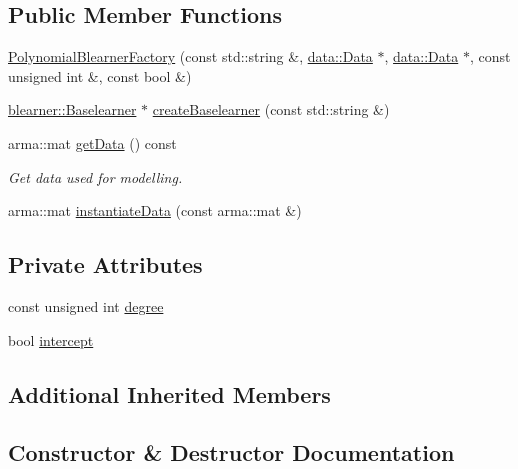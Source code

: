 \subsection*{Public Member Functions}
\begin{DoxyCompactItemize}
\item 
\mbox{\hyperlink{classblearnerfactory_1_1_polynomial_blearner_factory_a4db6750e7534eb7731cc3d60350d91cf}{Polynomial\+Blearner\+Factory}} (const std\+::string \&, \mbox{\hyperlink{classdata_1_1_data}{data\+::\+Data}} $\ast$, \mbox{\hyperlink{classdata_1_1_data}{data\+::\+Data}} $\ast$, const unsigned int \&, const bool \&)
\item 
\mbox{\hyperlink{classblearner_1_1_baselearner}{blearner\+::\+Baselearner}} $\ast$ \mbox{\hyperlink{classblearnerfactory_1_1_polynomial_blearner_factory_ac0c7f742da0a2de444e91a0cfb0a9384}{create\+Baselearner}} (const std\+::string \&)
\item 
arma\+::mat \mbox{\hyperlink{classblearnerfactory_1_1_polynomial_blearner_factory_addce36fbb590b2cd3d9325b53ae74566}{get\+Data}} () const
\begin{DoxyCompactList}\small\item\em Get data used for modelling. \end{DoxyCompactList}\item 
arma\+::mat \mbox{\hyperlink{classblearnerfactory_1_1_polynomial_blearner_factory_aeea9c480671ae7cf7d3be470ce0feaef}{instantiate\+Data}} (const arma\+::mat \&)
\end{DoxyCompactItemize}
\subsection*{Private Attributes}
\begin{DoxyCompactItemize}
\item 
const unsigned int \mbox{\hyperlink{classblearnerfactory_1_1_polynomial_blearner_factory_a78c1852e3f1e1b43e6d8bef40032e19f}{degree}}
\item 
bool \mbox{\hyperlink{classblearnerfactory_1_1_polynomial_blearner_factory_a3a358bd08863c8f01fe20c8d55393df7}{intercept}}
\end{DoxyCompactItemize}
\subsection*{Additional Inherited Members}


\subsection{Constructor \& Destructor Documentation}
\mbox{\label{classblearnerfactory_1_1_polynomial_blearner_factory_a4db6750e7534eb7731cc3d60350d91cf}} 
